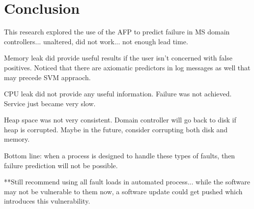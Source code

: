 \section{Conclusion}
This research explored the use of the AFP to predict failure in MS domain
controllers... unaltered, did not work... not enough lead time.

Memory leak did provide useful results if the user isn't concerned with false
positives.  Noticed that there are axiomatic predictors in log messages as well
that may precede SVM appraoch.

CPU leak did not provide any useful information.  Failure was not achieved.
Service just became very slow.

Heap space was not very consistent.  Domain controller will go back to disk if
heap is corrupted.  Maybe in the future, consider corrupting both disk and
memory.

Bottom line: when a process is designed to handle these types of faults, then
failure prediction will not be possible.

**Still recommend using all fault loads in automated process... while the
software may not be vulnerable to them now, a software update could get pushed
which introduces this vulnerability.
